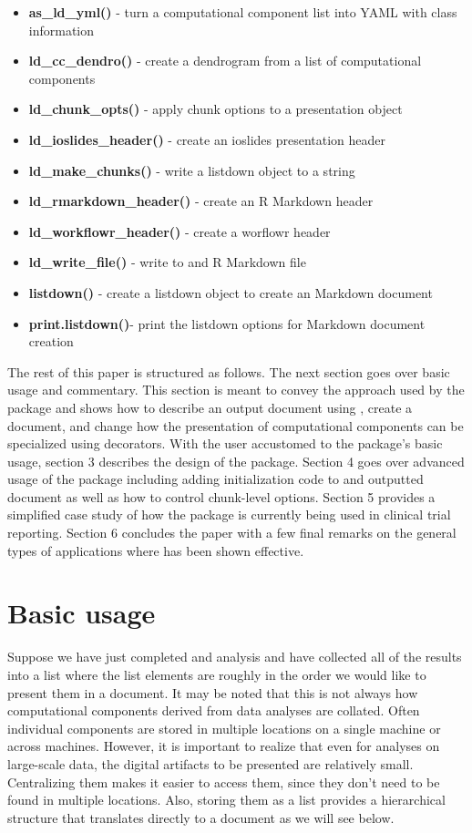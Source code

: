 \documentclass[
]{jss}
\begin{document}
\begin{itemize}
\item{\bf as\_ld\_yml() }{- turn a computational component list into YAML with class information}
\item{\bf ld\_cc\_dendro() }{- create a dendrogram from a list of computational components}
\item{\bf ld\_chunk\_opts() }{- apply chunk options to a presentation object}
\item{\bf ld\_ioslides\_header() }{- create an ioslides presentation header}
\item{\bf ld\_make\_chunks() }{- write a listdown object to a string}
\item{\bf ld\_rmarkdown\_header() }{- create an R Markdown header}
\item{\bf ld\_workflowr\_header() }{- create a worflowr header}
\item{\bf ld\_write\_file() }{- write to and R Markdown file}
\item{\bf listdown() }{- create a listdown object to create an  Markdown document}
\item{\bf print.listdown()}{- print the listdown options for  Markdown document creation}
\end{itemize}

The rest of this paper is structured as follows. The next section goes
over basic usage and commentary. This section is meant to convey the
approach used by the package and shows how to describe an output
document using , create a document, and change how the
presentation of computational components can be specialized using
 decorators. With the user accustomed to the package's
basic usage, section 3 describes the design of the package. Section 4
goes over advanced usage of the package including adding initialization
code to and outputted document as well as how to control chunk-level
options. Section 5 provides a simplified case study of how the package
is currently being used in clinical trial reporting. Section 6 concludes
the paper with a few final remarks on the general types of applications
where  has been shown effective.

\hypertarget{basic-usage}{%
\section{Basic usage}\label{basic-usage}}

Suppose we have just completed and analysis and have collected all of
the results into a list where the list elements are roughly in the order
we would like to present them in a document. It may be noted that this
is not always how computational components derived from data analyses
are collated. Often individual components are stored in multiple
locations on a single machine or across machines. However, it is
important to realize that even for analyses on large-scale data, the
digital artifacts to be presented are relatively small. Centralizing
them makes it easier to access them, since they don't need to be found
in multiple locations. Also, storing them as a list provides a
hierarchical structure that translates directly to a document as we will
see below.
\end{document}
